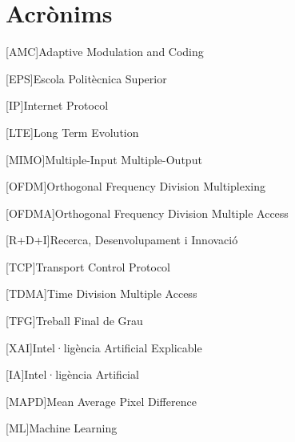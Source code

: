 \chapter{Acrònims} %
%
%
\begin{acronym}

[AMC]{Adaptive Modulation and Coding}

[EPS]{Escola Politècnica Superior}

[IP]{Internet Protocol}

[LTE]{Long Term Evolution}

[MIMO]{Multiple-Input Multiple-Output}

[OFDM]{Orthogonal Frequency Division Multiplexing}

[OFDMA]{Orthogonal Frequency Division Multiple Access}

[R+D+I]{Recerca, Desenvolupament i Innovació}

[TCP]{Transport Control Protocol}

[TDMA]{Time Division Multiple Access}

[TFG]{Treball Final de Grau}

[XAI]{Intel·ligència Artificial Explicable}

[IA]{Intel·ligència Artificial}

[MAPD]{Mean Average Pixel Difference}

[ML]{Machine Learning}











\end{acronym}
